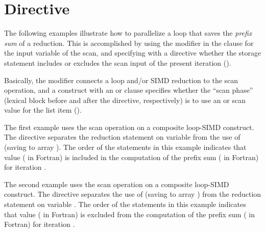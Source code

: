 \section{ Directive}
\label{sec:scan}

The following examples illustrate how to parallelize a loop that saves 
the \emph{prefix sum} of a reduction. This is accomplished by using 
the  modifier in the  clause for the input 
variable of the scan, and specifying with a  directive whether 
the storage statement includes or excludes the scan input of the present 
iteration ().

Basically, the  modifier connects a loop and/or SIMD reduction to 
the scan operation, and a  construct with an  or 
 clause specifies whether the ``scan phase'' (lexical block 
before and after the directive, respectively) is to use an  or 
 scan value for the list item ().

The first example uses the  scan operation on a composite
loop-SIMD construct. The  directive separates the reduction 
statement on variable  from the use of  (saving to array ).
The order of the statements in this example indicates that
value  ( in Fortran) is included in the computation of 
the prefix sum  ( in Fortran) for iteration .



The second example uses the  scan operation on a composite
loop-SIMD construct. The  directive separates the use of  
(saving to array ) from the reduction statement on variable .
The order of the statements in this example indicates that
value  ( in Fortran) is excluded from the computation 
of the prefix sum  ( in Fortran) for iteration .


